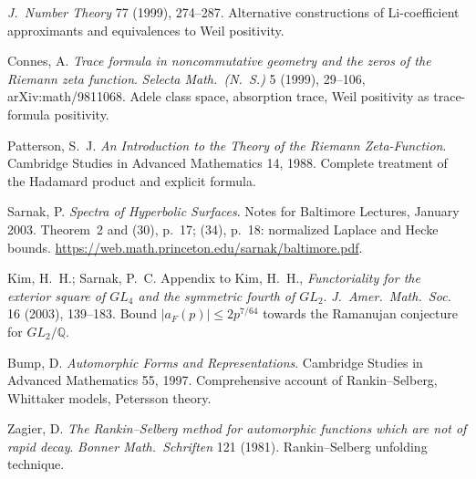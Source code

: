 \begin{description}
\emph{J.~Number Theory} 77 (1999), 274--287. Alternative constructions
of Li-coefficient approximants and equivalences to Weil positivity.
\item[Connes 1999.] Connes, A. \emph{Trace formula in noncommutative
geometry and the zeros of the Riemann zeta function}. \emph{Selecta
Math.~(N.~S.)} 5 (1999), 29--106, arXiv:math/9811068. Adele class
space, absorption trace, Weil positivity as trace-formula positivity.
\item[Patterson 1988.] Patterson, S.~J. \emph{An Introduction to the
Theory of the Riemann Zeta-Function}. Cambridge Studies in Advanced
Mathematics 14, 1988. Complete treatment of the Hadamard product
and explicit formula.
\item[Sarnak 2003.] Sarnak, P. \emph{Spectra of Hyperbolic Surfaces}.
Notes for Baltimore Lectures, January 2003. Theorem~2 and (30),
p.~17; (34), p.~18: normalized Laplace and Hecke bounds.
\url{https://web.math.princeton.edu/sarnak/baltimore.pdf}.

\item[Kim--Sarnak 2003.] Kim, H.~H.; Sarnak, P.~C. Appendix to
Kim, H.~H., \emph{Functoriality for the exterior square of \(GL_{4}\)
and the symmetric fourth of \(GL_{2}\)}. \emph{J.~Amer.~Math.~Soc.} 16
(2003), 139--183. Bound \(|a_{F}(p)|\leq 2p^{7/64}\) towards the
Ramanujan conjecture for \(GL_{2}/\mathbb{Q}\).
\item[Bump 1997.] Bump, D. \emph{Automorphic Forms and
Representations}. Cambridge Studies in Advanced Mathematics 55, 1997.
Comprehensive account of Rankin--Selberg, Whittaker models,
Petersson theory.
\item[Zagier 1981.] Zagier, D. \emph{The Rankin--Selberg method for
automorphic functions which are not of rapid decay}.
\emph{Bonner Math.~Schriften} 121 (1981). Rankin--Selberg unfolding
technique.
\end{description}
